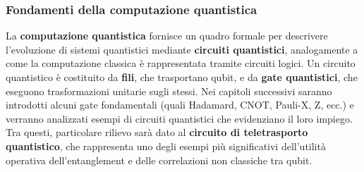 \documentclass[a4paper,12pt]{report}
\theoremstyle{plain}
\begin{document}
\subsubsection{Fondamenti della computazione quantistica}
La \textbf{computazione quantistica} fornisce un quadro formale per descrivere l'evoluzione di sistemi quantistici mediante \textbf{circuiti quantistici}, analogamente a come la computazione classica è rappresentata tramite circuiti logici. Un circuito quantistico è costituito da \textbf{fili}, che trasportano qubit, e da \textbf{gate quantistici}, che eseguono trasformazioni unitarie sugli stessi.
Nei capitoli successivi saranno introdotti alcuni gate fondamentali (quali Hadamard, CNOT, Pauli-X, Z, ecc.) e verranno analizzati esempi di circuiti quantistici che evidenziano il loro impiego. Tra questi, particolare rilievo sarà dato al \textbf{circuito di teletrasporto quantistico}, che rappresenta uno degli esempi più significativi dell'utilità operativa dell'entanglement e delle correlazioni non classiche tra qubit.
\end{document}
